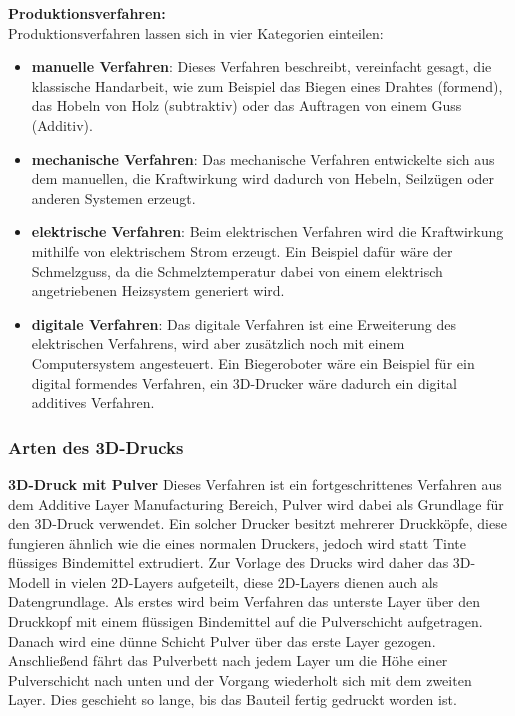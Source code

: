 \textbf{Produktionsverfahren:}\\
 Produktionsverfahren lassen sich in vier Kategorien einteilen:
\begin{itemize}
    \item \textbf{manuelle Verfahren}: Dieses Verfahren beschreibt, vereinfacht gesagt, die klassische Handarbeit, wie zum Beispiel das Biegen eines Drahtes (formend), das Hobeln von Holz (subtraktiv) oder das Auftragen von einem Guss (Additiv).
    \item \textbf{mechanische Verfahren}: Das mechanische Verfahren entwickelte sich aus dem manuellen, die Kraftwirkung wird dadurch von Hebeln, Seilzügen oder anderen Systemen erzeugt.
    \item \textbf{elektrische Verfahren}: Beim elektrischen Verfahren wird die Kraftwirkung mithilfe von elektrischem Strom erzeugt. Ein Beispiel dafür wäre der Schmelzguss, da die Schmelztemperatur dabei von einem elektrisch angetriebenen Heizsystem generiert wird.
    \item \textbf{digitale Verfahren}: Das digitale Verfahren ist eine Erweiterung des elektrischen Verfahrens, wird aber zusätzlich noch mit einem Computersystem angesteuert. Ein Biegeroboter wäre ein Beispiel für ein digital formendes Verfahren, ein 3D-Drucker wäre dadurch ein digital additives Verfahren.
\end{itemize}

\subsubsection{Arten des 3D-Drucks}
\textbf{3D-Druck mit Pulver}
Dieses Verfahren ist ein fortgeschrittenes Verfahren aus dem Additive Layer Manufacturing Bereich, Pulver wird dabei
als Grundlage für den 3D-Druck verwendet.
Ein solcher Drucker besitzt mehrerer Druckköpfe, diese fungieren ähnlich wie die eines normalen Druckers, jedoch wird statt Tinte flüssiges Bindemittel extrudiert.
Zur Vorlage des Drucks wird daher das 3D-Modell in vielen 2D-Layers aufgeteilt, diese 2D-Layers dienen auch als Datengrundlage.
Als erstes wird beim Verfahren das unterste Layer über den Druckkopf mit einem flüssigen Bindemittel auf die Pulverschicht aufgetragen.
Danach wird eine dünne Schicht Pulver über das erste Layer gezogen.
Anschließend fährt das Pulverbett nach jedem Layer um die Höhe einer Pulverschicht nach unten und der Vorgang wiederholt sich mit dem zweiten Layer.
Dies geschieht so lange, bis das Bauteil fertig gedruckt worden ist.\\

